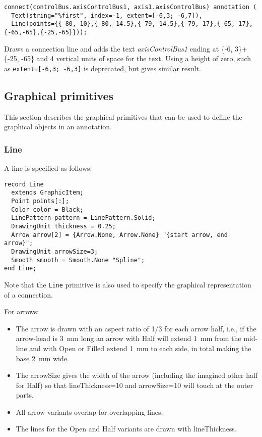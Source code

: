 \begin{example}
\begin{lstlisting}[language=modelica]
connect(controlBus.axisControlBus1, axis1.axisControlBus) annotation (
  Text(string="%first", index=-1, extent=[-6,3; -6,7]),
  Line(points={{-80,-10},{-80,-14.5},{-79,-14.5},{-79,-17},{-65,-17},{-65,-65},{-25,-65}}));
\end{lstlisting}
Draws a connection line and adds the text \emph{axisControlBus1}
ending at \{-6, 3\}+\{-25, -65\} and 4 vertical units of space for the text.
Using a height of zero, such as \lstinline!extent=[-6,3; -6,3]! is deprecated, but gives similar result.
\end{example}

\subsection{Graphical primitives}\label{graphical-primitives}

This section describes the graphical primitives that can be used to
define the graphical objects in an annotation.

\subsubsection{Line}\label{line}

A line is specified as follows:
\begin{lstlisting}[language=modelica]
record Line
  extends GraphicItem;
  Point points[:];
  Color color = Black;
  LinePattern pattern = LinePattern.Solid;
  DrawingUnit thickness = 0.25;
  Arrow arrow[2] = {Arrow.None, Arrow.None} "{start arrow, end arrow}";
  DrawingUnit arrowSize=3;
  Smooth smooth = Smooth.None "Spline";
end Line;
\end{lstlisting}
Note that the \lstinline!Line! primitive is also used to specify the graphical
representation of a connection.

For arrows:
\begin{itemize}
\item
  The arrow is drawn with an aspect ratio of 1/3 for each arrow half, i.e.,
if the arrow-head is 3~mm long an arrow with Half will extend 1~mm from the
mid-line and with Open or Filled extend 1~mm to each side, in total making the base 2~mm wide.
\item
  The arrowSize gives the width of the arrow (including the imagined
  other half for Half) so that lineThickness=10 and arrowSize=10 will
  touch at the outer parts.
\item
  All arrow variants overlap for overlapping lines.
\item
  The lines for the Open and Half variants are drawn with lineThickness.
\end{itemize}

